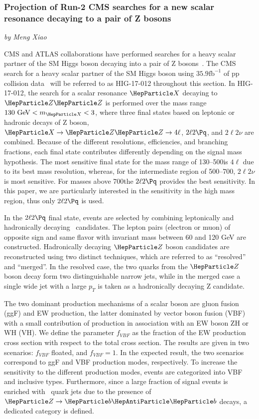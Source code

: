 \subsubsection{Projection of Run-2 CMS searches for a new scalar resonance decaying to a pair of Z bosons}
\begin{center}
 {\it{ by Meng Xiao}}
\end{center}

CMS and ATLAS collaborations have performed searches for a heavy scalar partner of the SM Higgs boson decaying into a pair of Z bosons~\cite{Aaboud:2018bun,Sirunyan:2018qlb}. The CMS search for a heavy scalar partner of the SM Higgs boson using $35.9 \mathrm{fb}^{-1}$ of pp collision data~\cite{Sirunyan:2018qlb} will be referred to as HIG-17-012 throughout this section. In HIG-17-012, the search for a scalar resonance $\PX$ decaying to $\PZ \PZ$ is performed over the mass range $130\UGeV < m_{\PX} < 3$\UTeV, where three final states based on leptonic or hadronic decays of Z boson, $\PX\to \PZ\PZ\to 4\ell$, $2\ell2\Pq$, and $2\ell2\nu$ are combined. Because of the different resolutions, efficiencies, and branching fractions, each final state contributes differently depending on the signal mass hypothesis. The most sensitive final state for the mass range of 130--500\UGeV is $4\ell$ due to its best mass resolution, whereas, for the intermediate region of 500--700\UGeV, $2\ell2\nu$ is most sensitive. For masses above 700\UGeV the $2\ell2\Pq$ provides the best sensitivity. In this paper, we are particularly interested in the sensitivity in the high mass region, thus only $2\ell2\Pq$ is used. 

In the $2\ell2\Pq$ final state, events are selected by combining leptonically
and hadronically decaying \PZ\ candidates. The lepton pairs (electron or muon) of opposite sign and same flavor 
with invariant mass between 60 and 120 GeV are constructed.
Hadronically decaying $\PZ$ boson candidates are reconstructed using two distinct
techniques, which are referred to as ``resolved'' and ``merged''.
In the resolved case, the two quarks from the $\PZ$ boson decay form two distinguishable narrow jets, while in the merged case a single wide jet with a large $p_T$ is taken as a hadronically decaying Z candidate.

The two dominant production mechanisms of a scalar boson are gluon fusion (ggF) and EW production, the latter dominated by vector boson fusion (VBF) with a small contribution of
production in association with an EW boson ZH or WH (VH). We define the parameter $f_{VBF}$ as the fraction of the EW production cross section with respect to the total cross section. The results are given in two scenarios: $f_{VBF}$ floated, and $f_{VBF}=1$. In the expected result, the two scenarios correspond to ggF and VBF production modes, respectively. To increase the sensitivity to the different production modes, events are categorized into VBF and inclusive types. Furthermore, since a large fraction of signal events is enriched with \PQb\ quark jets due to the presence of $\PZ\to\PQb\PAQb$ decays, a dedicated category is defined.

